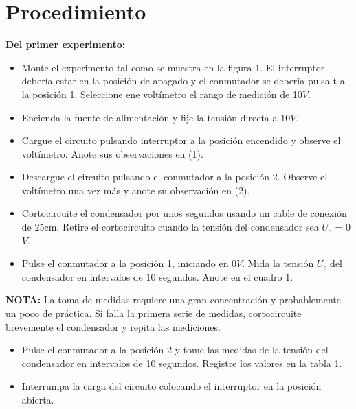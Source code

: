 \section{Procedimiento}
\textbf{Del primer experimento:}
\begin{itemize}
	\item Monte el experimento tal como se muestra en la figura  1. El interruptor debería estar en la posición de apagado y el conmutador se debería pulsa t a la posición 1. Seleccione ene voltímetro el rango de medición de 10$V$.
	\item Encienda la fuente de alimentación y fije la tensión directa a 10$V$.
	\item Cargue el circuito pulsando interruptor a la posición encendido y observe el voltímetro. Anote sus observaciones en (1).
	\item Descargue el circuito pulsando el conmutador a la posición 2. Observe el voltímetro  una vez más y anote su observación en (2).
	\item Cortocircuite el condensador por unos segundos usando un cable de conexión de 25cm. Retire el cortocircuito cuando la  tensión del condensador sea $U_{c}$ = 0$V$.
	\item Pulse el conmutador a la posición 1, iniciando en 0$V$. Mida la tensión $U_{c}$ del condensador en intervalos de 10 segundos. Anote en el cuadro 1.
\end{itemize}
\textbf{NOTA:} La toma de medidas requiere  una gran concentración y probablemente un poco de práctica. Si falla la primera serie de medidas, cortocircuite brevemente el condensador y repita las mediciones.
\begin{itemize}
	\item Pulse el conmutador a la posición 2 y tome las medidas de la tensión del condensador en intervalos de 10 segundos. Registre los valores en la tabla 1.
	\item Interrumpa la carga del circuito colocando el interruptor en la posición abierta.
\end{itemize}

